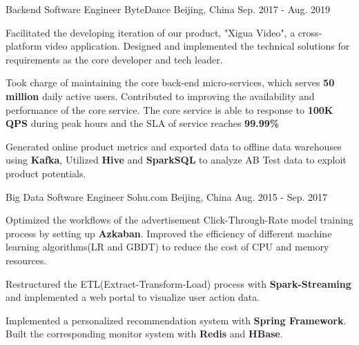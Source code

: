 
\begin{cventries}

  \cventry
    {Backend Software Engineer} %
    {ByteDance} %
    {Beijing, China} %
    {Sep. 2017 - Aug. 2019} %
    {
      \begin{cvitems} 
        \item {Facilitated the developing iteration of our product, "Xigua Video", a cross-platform video application. Designed and implemented the technical solutions for requirements as the core developer and tech leader.}  
        \item {Took charge of maintaining the core back-end micro-services, which serves \textbf{50 million} daily active users. Contributed to improving the availability and performance of the core service. The core service is able to response to \textbf{100K QPS} during peak hours and the SLA of service reaches \textbf{99.99\%}}
        \item {Generated online product metrics and exported data to offline data warehouses using \textbf{Kafka}, Utilized \textbf{Hive} and \textbf{SparkSQL} to analyze AB Test data to exploit product potentials.}
      \end{cvitems}
    }

  \cventry
    {Big Data Software Engineer} %
    {Sohu.com} %
    {Beijing, China} %
    {Aug. 2015 - Sep. 2017} %
    {
        \begin{cvitems}
          \item{Optimized the workflows of the advertisement Click-Through-Rate model training process by setting up \textbf{Azkaban}. Improved the efficiency of different machine learning algorithms(LR and GBDT) to reduce the cost of CPU and memory resources.}
          \item{Restructured the ETL(Extract-Transform-Load) process with \textbf{Spark-Streaming} and implemented a web portal to visualize user action data.}
          \item{Implemented a personalized recommendation system with \textbf{Spring Framework}. Built the corresponding monitor system with \textbf{Redis} and \textbf{HBase}.}
        \end{cvitems}
    }
    

\end{cventries}

